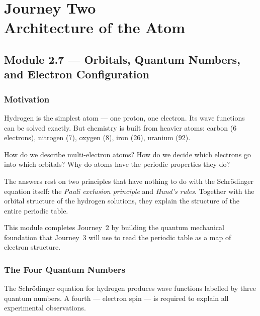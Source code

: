 \documentclass[12pt, a4paper]{book}
\newcommand{\newterm}[1]{\textit{\textcolor{DiscoveryColor}{#1}}}
\begin{document}
\setcounter{chapter}{1}
\chapter[Journey 2 --- Architecture of the Atom]
        {Journey Two\\[8pt]
         \textcolor{ModuleColor}{\large Architecture of the Atom}}
\setcounter{section}{6}

\section{Module 2.7 --- Orbitals, Quantum Numbers, and Electron Configuration}
\label{sec:mod2.7}

\subsection*{Motivation}

Hydrogen is the simplest atom --- one proton, one electron.
Its wave functions can be solved exactly.
But chemistry is built from heavier atoms: carbon (6 electrons),
nitrogen (7), oxygen (8), iron (26), uranium (92).

How do we describe multi-electron atoms?
How do we decide which electrons go into which orbitals?
Why do atoms have the periodic properties they do?

The answers rest on two principles that have nothing to do
with the Schr\"{o}dinger equation itself: the
\newterm{Pauli exclusion principle} and \newterm{Hund's rules}.
Together with the orbital structure of the hydrogen solutions,
they explain the structure of the entire periodic table.

This module completes Journey~2 by building the quantum
mechanical foundation that Journey~3 will use to read
the periodic table as a map of electron structure.

\subsection{The Four Quantum Numbers}

The Schr\"{o}dinger equation for hydrogen produces wave
functions labelled by three quantum numbers.
A fourth --- electron spin --- is required to explain
all experimental observations.
\end{document}
